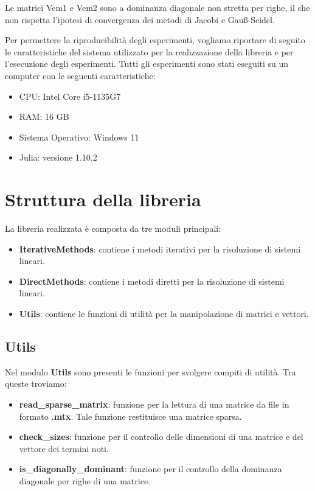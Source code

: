 \begin{nota}
    Le matrici Vem1 e Vem2 sono a dominanza diagonale non stretta per righe, il
    che non rispetta l'ipotesi di convergenza dei metodi di Jacobi e Gauß-Seidel.
\end{nota}

Per permettere la riproducibilità degli esperimenti, vogliamo riportare di seguito
le caratteristiche del sistema utilizzato per la realizzazione della libreria e
per l'esecuzione degli esperimenti. Tutti gli esperimenti sono stati eseguiti su
un computer con le seguenti caratteristiche:
\begin{itemize}
    \item CPU: Intel Core i5-1135G7
    \item RAM: 16 GB
    \item Sistema Operativo: Windows 11
    \item Julia: versione 1.10.2
\end{itemize}
\section{Struttura della libreria}
La libreria realizzata è composta da tre moduli principali:
\begin{itemize}
    \item \textbf{IterativeMethods}: contiene i metodi iterativi per la risoluzione
          di sistemi lineari.
    \item \textbf{DirectMethods}: contiene i metodi diretti per la risoluzione
          di sistemi lineari.
    \item \textbf{Utils}: contiene le funzioni di utilità per la manipolazione
          di matrici e vettori.
\end{itemize}

\subsection{Utils}
Nel modulo \textbf{Utils} sono presenti le funzioni per svolgere compiti di
utilità. Tra queste troviamo:
\begin{itemize}
    \item \textbf{read\_sparse\_matrix}: funzione per la lettura di una matrice
          da file in formato \textbf{.mtx}. Tale funzione restituisce una matrice
          sparsa.
    \item \textbf{check\_sizes}: funzione per il controllo delle dimensioni di
          una matrice e del vettore dei termini noti.
    \item \textbf{is\_diagonally\_dominant}: funzione per il controllo della
          dominanza diagonale per righe di una matrice.
\end{itemize}
